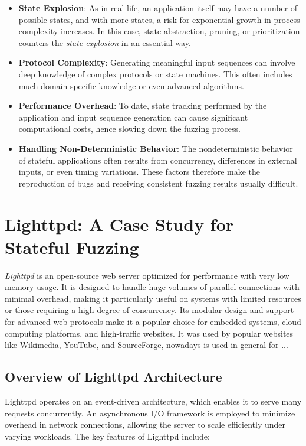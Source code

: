 \begin{itemize}
    \item \textbf{State Explosion}: As in real life, an application itself may have a number of possible states, and with more states, a risk for exponential growth in process complexity increases. In this case, state abstraction, pruning, or prioritization counters the \textit{state explosion} in an essential way.
    
    \item \textbf{Protocol Complexity}: Generating meaningful input sequences can involve deep knowledge of complex protocols or state machines. This often includes much domain-specific knowledge or even advanced algorithms.
    
    \item \textbf{Performance Overhead}: To date, state tracking performed by the application and input sequence generation can cause significant computational costs, hence slowing down the fuzzing process.

    \item \textbf{Handling Non-Deterministic Behavior}: The nondeterministic behavior of stateful applications often results from concurrency, differences in external inputs, or even timing variations. These factors therefore make the reproduction of bugs and receiving consistent fuzzing results usually difficult.

\end{itemize}

\section{Lighttpd: A Case Study for Stateful Fuzzing}
\textit{Lighttpd} is an open-source web server optimized for performance with very low memory usage. It is designed to handle huge volumes of parallel connections with minimal overhead, making it particularly useful on systems with limited resources or those requiring a high degree of concurrency. Its modular design and support for advanced web protocols make it a popular choice for embedded systems, cloud computing platforms, and high-traffic websites. It was used by popular websites like Wikimedia, YouTube, and SourceForge, nowadays is used in general for ...%

\subsection{Overview of Lighttpd Architecture}
Lighttpd operates on an event-driven architecture, which enables it to serve many requests concurrently. An asynchronous I/O framework is employed to minimize overhead in network connections, allowing the server to scale efficiently under varying workloads. The key features of Lighttpd include:

